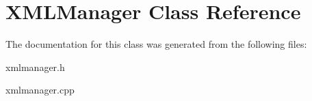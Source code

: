 \hypertarget{classXMLManager}{\section{X\+M\+L\+Manager Class Reference}
\label{classXMLManager}
}


The documentation for this class was generated from the following files\+:\begin{DoxyCompactItemize}
\item 
xmlmanager.\+h\item 
xmlmanager.\+cpp\end{DoxyCompactItemize}
